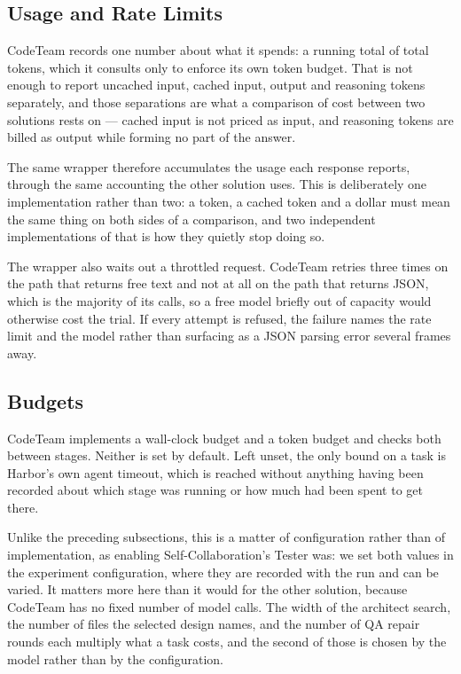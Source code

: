 \subsection{Usage and Rate Limits}

CodeTeam records one number about what it spends: a running total of total
tokens, which it consults only to enforce its own token budget. That is not
enough to report uncached input, cached input, output and reasoning tokens
separately, and those separations are what a comparison of cost between two
solutions rests on --- cached input is not priced as input, and reasoning tokens
are billed as output while forming no part of the answer.

The same wrapper therefore accumulates the usage each response reports, through
the same accounting the other solution uses. This is deliberately one
implementation rather than two: a token, a cached token and a dollar must mean
the same thing on both sides of a comparison, and two independent
implementations of that is how they quietly stop doing so.

The wrapper also waits out a throttled request. CodeTeam retries three times on
the path that returns free text and not at all on the path that returns JSON,
which is the majority of its calls, so a free model briefly out of capacity
would otherwise cost the trial. If every attempt is refused, the failure names
the rate limit and the model rather than surfacing as a JSON parsing error
several frames away.

\subsection{Budgets}

CodeTeam implements a wall-clock budget and a token budget and checks both
between stages. Neither is set by default. Left unset, the only bound on a task
is Harbor's own agent timeout, which is reached without anything having been
recorded about which stage was running or how much had been spent to get there.

Unlike the preceding subsections, this is a matter of configuration rather than
of implementation, as enabling Self-Collaboration's Tester was: we set both
values in the experiment configuration, where they are recorded with the run and
can be varied. It matters more here than it would for the other solution,
because CodeTeam has no fixed number of model calls. The width of the architect
search, the number of files the selected design names, and the number of QA
repair rounds each multiply what a task costs, and the second of those is chosen
by the model rather than by the configuration.

